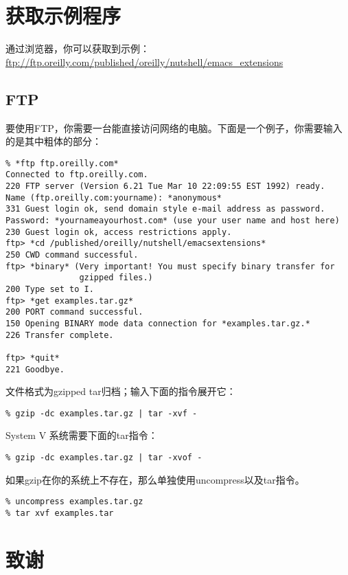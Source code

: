 \section{获取示例程序}
\label{section:00-Obtaining-the-Example-Programs}

通过浏览器，你可以获取到示例：\url{ftp://ftp.oreilly.com/published/oreilly/nutshell/emacs_extensions}

\subsection{FTP}
\label{section:00-FTP}

要使用FTP，你需要一台能直接访问网络的电脑。下面是一个例子，你需要输入的是其中粗体的部分：

\begin{verbatim}
% *ftp ftp.oreilly.com*
Connected to ftp.oreilly.com.
220 FTP server (Version 6.21 Tue Mar 10 22:09:55 EST 1992) ready.
Name (ftp.oreilly.com:yourname): *anonymous*
331 Guest login ok, send domain style e-mail address as password.
Password: *yournameayourhost.com* (use your user name and host here)
230 Guest login ok, access restrictions apply.
ftp> *cd /published/oreilly/nutshell/emacsextensions*
250 CWD command successful.
ftp> *binary* (Very important! You must specify binary transfer for
               gzipped files.)
200 Type set to I.
ftp> *get examples.tar.gz*
200 PORT command successful.
150 Opening BINARY mode data connection for *examples.tar.gz.*
226 Transfer complete.

ftp> *quit*
221 Goodbye.
\end{verbatim}

文件格式为gzipped tar归档；输入下面的指令展开它：
\begin{verbatim}
% gzip -dc examples.tar.gz | tar -xvf -
\end{verbatim}

System V 系统需要下面的tar指令：
\begin{verbatim}
% gzip -dc examples.tar.gz | tar -xvof -
\end{verbatim}

如果gzip在你的系统上不存在，那么单独使用uncompress以及tar指令。
\begin{verbatim}
% uncompress examples.tar.gz
% tar xvf examples.tar
\end{verbatim}

\section{致谢}
\label{section:00-Acknowlegments}

